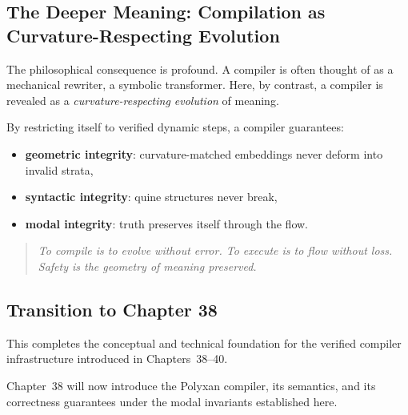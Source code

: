 \subsection{The Deeper Meaning:  
Compilation as Curvature-Respecting Evolution}

The philosophical consequence is profound.
A compiler is often thought of as a mechanical rewriter, a symbolic
transformer.  
Here, by contrast, a compiler is revealed as a \emph{curvature-respecting
evolution} of meaning.

By restricting itself to verified dynamic steps, a compiler guarantees:

\begin{itemize}
\item \textbf{geometric integrity}: curvature-matched embeddings never
    deform into invalid strata,

\item \textbf{syntactic integrity}: quine structures never break,

\item \textbf{modal integrity}: truth preserves itself through the flow.
\end{itemize}

\begin{quote}
\textit{
To compile is to evolve without error.  
To execute is to flow without loss.  
Safety is the geometry of meaning preserved.}
\end{quote}

\subsection{Transition to Chapter 38}

This completes the conceptual and technical foundation for the verified
compiler infrastructure introduced in Chapters~38--40.

Chapter~38 will now introduce the Polyxan compiler, its semantics, and
its correctness guarantees under the modal invariants established here.


